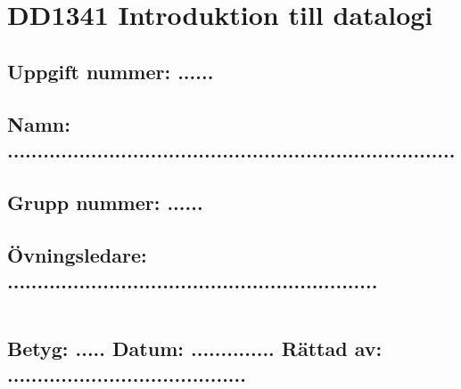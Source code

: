 %

%

\thispagestyle{empty}
\section*{DD1341 Introduktion till datalogi}

\vspace{10mm}

\subsection*{Uppgift nummer: ......}

\vspace{3mm}

\subsection*{Namn: ...........................................................................}

\vspace{3mm}

\subsection*{Grupp nummer: ......}

\vspace{3mm}

\subsection*{Övningsledare: ..............................................................}


\vspace{10mm}

\begin{tabular}{l}
 \hspace{140mm} \\
\hline \hline
\end{tabular}

\vspace{5mm}

\subsection*{Betyg: ..... \hspace{2mm}  Datum: .............. \hspace{2mm} Rättad av: ........................................}


%
